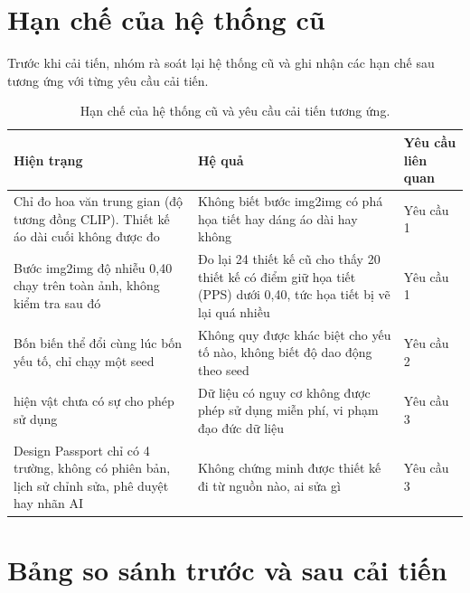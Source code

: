 \documentclass[12pt,a4paper]{report}
\begin{document}
\section{Hạn chế của hệ thống cũ}

Trước khi cải tiến, nhóm rà soát lại hệ thống cũ và ghi nhận các hạn chế sau tương ứng với từng yêu cầu cải tiến.

\begin{table}[H]
\centering
\small
\caption{Hạn chế của hệ thống cũ và yêu cầu cải tiến tương ứng.}
\label{tab:hanche}
\begin{tabularx}{\textwidth}{>{\raggedright\arraybackslash}p{3.2cm}>{\raggedright\arraybackslash}X>{\raggedright\arraybackslash}p{3.0cm}}
\toprule
\textbf{Hiện trạng} & \textbf{Hệ quả} & \textbf{Yêu cầu liên quan} \\
\midrule
Chỉ đo hoa văn trung gian (độ tương đồng CLIP). Thiết kế áo dài cuối không được đo &
Không biết bước img2img có phá họa tiết hay dáng áo dài hay không & Yêu cầu 1 \\
Bước img2img độ nhiễu 0,40 chạy trên toàn ảnh, không kiểm tra sau đó &
Đo lại 24 thiết kế cũ cho thấy 20 thiết kế có điểm giữ họa tiết (PPS) dưới 0,40, tức họa tiết bị vẽ lại quá nhiều & Yêu cầu 1 \\
Bốn biến thể đổi cùng lúc bốn yếu tố, chỉ chạy một seed &
Không quy được khác biệt cho yếu tố nào, không biết độ dao động theo seed & Yêu cầu 2 \\
6 hiện vật chưa có sự cho phép sử dụng & Dữ liệu có nguy cơ không được phép sử dụng miễn phí, vi phạm đạo đức dữ liệu & Yêu cầu 3 \\
Design Passport chỉ có 4 trường, không có phiên bản, lịch sử chỉnh sửa, phê duyệt hay nhãn AI &
Không chứng minh được thiết kế đi từ nguồn nào, ai sửa gì & Yêu cầu 3 \\
\bottomrule
\end{tabularx}
\end{table}

\section{Bảng so sánh trước và sau cải tiến}
\end{document}
